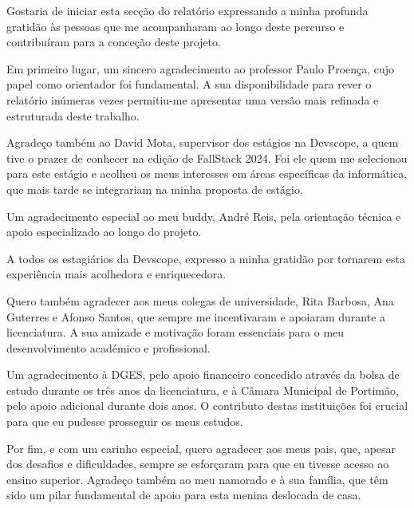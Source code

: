 \begin{acknowledgements}
    Gostaria de iniciar esta secção do relatório expressando a minha profunda gratidão às pessoas que me acompanharam ao longo deste percurso e contribuíram para a conceção deste projeto.
    
    Em primeiro lugar, um sincero agradecimento ao professor Paulo Proença, cujo papel como orientador foi fundamental. A sua disponibilidade para rever o relatório inúmeras vezes permitiu-me apresentar uma versão mais refinada e estruturada deste trabalho.
    
    Agradeço também ao David Mota, supervisor dos estágios na Devscope, a quem tive o prazer de conhecer na edição de FallStack 2024. Foi ele quem me selecionou para este estágio e acolheu os meus interesses em áreas específicas da informática, que mais tarde se integrariam na minha proposta de estágio.

    Um agradecimento especial ao meu buddy, André Reis, pela orientação técnica e apoio especializado ao longo do projeto.
    
    A todos os estagiários da Devscope, expresso a minha gratidão por tornarem esta experiência mais acolhedora e enriquecedora.
    
    Quero também agradecer aos meus colegas de universidade, Rita Barbosa, Ana Guterres e Afonso Santos, que sempre me incentivaram e apoiaram durante a licenciatura. A sua amizade e motivação foram essenciais para o meu desenvolvimento académico e profissional.
    
    Um agradecimento à DGES, pelo apoio financeiro concedido através da bolsa de estudo durante os três anos da licenciatura, e à Câmara Municipal de Portimão, pelo apoio adicional durante dois anos. O contributo destas instituições foi crucial para que eu pudesse prosseguir os meus estudos.
    
    Por fim, e com um carinho especial, quero agradecer aos meus pais, que, apesar dos desafios e dificuldades, sempre se esforçaram para que eu tivesse acesso ao ensino superior. Agradeço também ao meu namorado e à sua família, que têm sido um pilar fundamental de apoio para esta menina deslocada de casa.

\end{acknowledgements}



